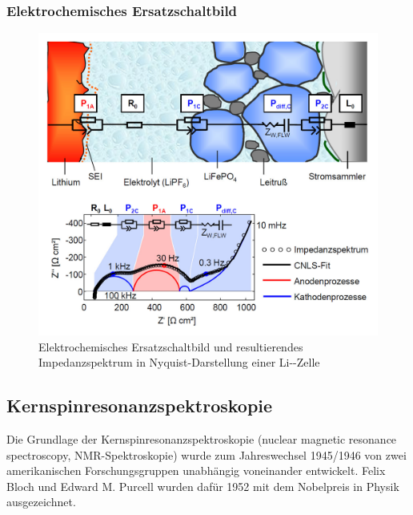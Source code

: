 \documentclass[a4paper, 11pt, headsepline,footsepline,twoside,abstract]{scrbook}
\begin{document}
\subsubsection{Elektrochemisches Ersatzschaltbild}
\begin{figure}
	\centering
	\includegraphics[width=0.8\columnwidth]{images/Schema_IS.jpg}
	\caption{Elektrochemisches Ersatzschaltbild und resultierendes Impedanzspektrum in Nyquist-Darstellung einer Li--Zelle}
	\label{schema_is}
\end{figure}
\subsection{Kernspinresonanzspektroskopie}
Die Grundlage der Kernspinresonanzspektroskopie (nuclear magnetic resonance spectroscopy, NMR-Spektroskopie) wurde zum Jahreswechsel 1945/1946 von zwei amerikanischen Forschungsgruppen unabhängig voneinander entwickelt. Felix Bloch und Edward M. Purcell wurden dafür 1952 mit dem Nobelpreis in Physik ausgezeichnet.
\end{document}

